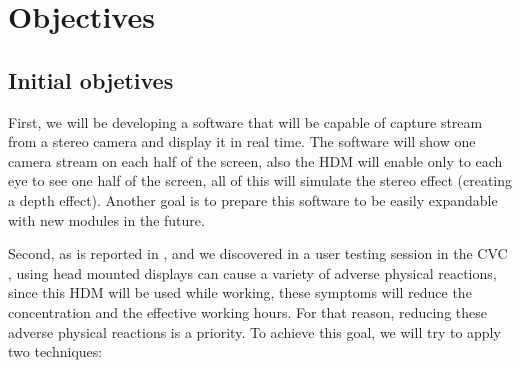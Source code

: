 \documentclass[10pt,a4paper,twocolumn,twoside]{article}
\begin{document}
	
	
	
	
	\section{Objectives}
	
	\subsection{Initial objetives}
	First, we will be developing a software that will be capable of capture stream from a stereo camera and display it in real time. The software will show one camera stream on each half of the screen, also the HDM will enable only to each eye to see one half of the screen, all of this will simulate the stereo effect (creating a depth effect). Another goal is to prepare this software to be easily expandable with new modules in the future.
	
	Second, as is reported in \cite{disconfortReview}, and we discovered in a user testing session in the CVC \cite{unpublishCVC}, using head mounted displays can cause a variety of adverse physical reactions, since this HDM will be used while working, these symptoms will reduce the concentration and the effective working hours. For that reason, reducing these adverse physical reactions is a priority. To achieve this goal, we will try to apply two techniques: 
	
\end{document}
